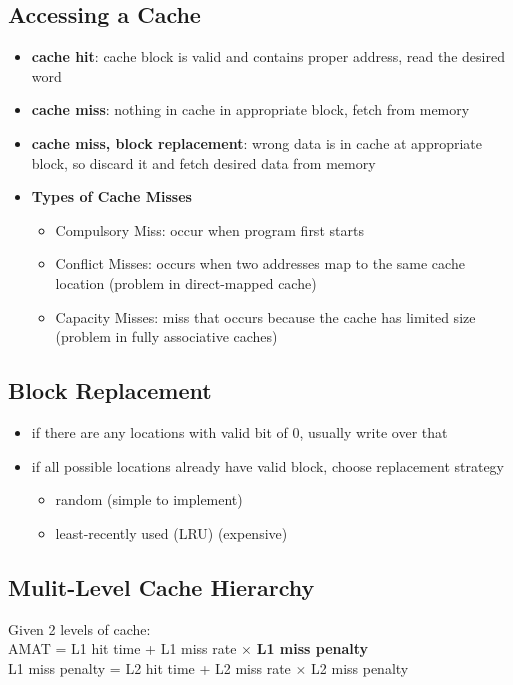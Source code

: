 \documentclass{../cheatsheet}
\begin{document}
\begin{multicols*}{2}
    \subsection{Accessing a Cache}
    \begin{itemize}
        \item \textbf{cache hit}: cache block is valid and contains proper
            address, read the desired word
        \item \textbf{cache miss}: nothing in cache in appropriate block, fetch
            from memory
        \item \textbf{cache miss, block replacement}: wrong data is in cache at
            appropriate block, so discard it and fetch desired data from memory
        \item \textbf{Types of Cache Misses}
            \begin{itemize}
                \item Compulsory Miss: occur when program first starts
                \item Conflict Misses: occurs when two addresses map to the same
                    cache location (problem in direct-mapped cache)
                \item Capacity Misses: miss that occurs because the cache has
                    limited size (problem in fully associative caches)
            \end{itemize}
    \end{itemize}

    \subsection{Block Replacement}
    \begin{itemize}
        \item if there are any locations with valid bit of 0, usually write over
            that
        \item if all possible locations already have valid block, choose
            replacement strategy
            \begin{itemize}
                \item random (simple to implement)
                \item least-recently used (LRU) (expensive)
            \end{itemize}
    \end{itemize}

    \subsection{Mulit-Level Cache Hierarchy}
    Given 2 levels of cache:\\
    AMAT = L1 hit time + L1 miss rate $\times$ \textbf{L1 miss penalty}\\
    L1 miss penalty = L2 hit time + L2 miss rate $\times$ L2 miss penalty


\end{multicols*}
\end{document}
